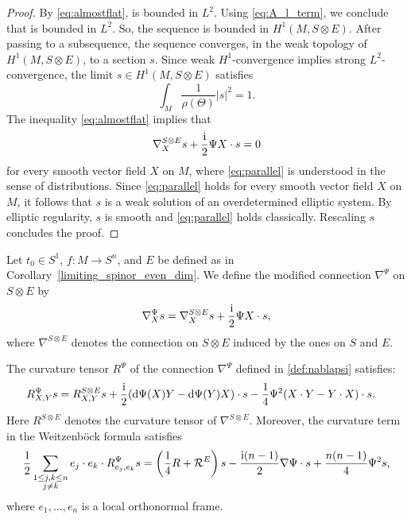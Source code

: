 \begin{proof}
By \eqref{eq:almostflat},  is bounded in $L^2$. Using \eqref{eq:A_l_term}, we conclude that  is bounded in $L^2$. So, the sequence  is bounded in $H^1(M,S \otimes E)$.
After passing to a subsequence, the sequence  converges, in the weak topology of $H^1(M,S \otimes E)$, to a section $s$.
Since weak $H^1$-convergence implies strong $L^2$-convergence, the limit $s \in H^1(M,S \otimes E)$ satisfies
\[
\int_M \frac{1}{\rho(\Theta)} |s|^2 = 1.
\]
The inequality \eqref{eq:almostflat} implies that
\begin{equation}
\nabla_X^{S \otimes E} s + \frac{\rm i}{2} \Psi X \cdot s = 0
\label{eq:parallel}
\end{equation}
for every smooth vector field $X$ on $M$, where \eqref{eq:parallel} is understood in the sense of distributions.
Since \eqref{eq:parallel} holds for every smooth vector field $X$ on $M$, it follows
that $s$ is a weak solution of an overdetermined elliptic system.
By elliptic regularity, $s$ is smooth and \eqref{eq:parallel} holds classically.
Rescaling $s$ concludes the proof.
\end{proof}

\begin{Definition}
Let $t_0 \in S^1$, $f\colon M \to S^n$, and $E$ be defined as in Corollary~\ref{limiting_spinor_even_dim}.
We define the modified connection $\nabla^\Psi$ on $S \otimes E $ by
\begin{equation}
\nabla_X^\Psi s = \nabla_X^{S \otimes E} s + \frac{\rm i}{2} \Psi X \cdot s,
\label{def:nablapsi}
\end{equation}
where $\nabla^{S \otimes E}$ denotes the connection on $S \otimes E$ induced by the ones on $S$ and $E$.
\end{Definition}

\begin{Lemma}
The curvature tensor $R^\Psi$ of the connection $\nabla^\Psi$ defined in \eqref{def:nablapsi} satisfies:
\begin{align}
R^\Psi_{X,Y}s
&=
R^{S\otimes E}_{X,Y}s + \frac{\rm i}{2} ({\rm d}\Psi(X)Y-{\rm d}\Psi(Y)X) \cdot s - \frac{1}{4} \Psi^2 (X\cdot Y-Y\cdot X)\cdot s .
\label{eq:RPsi}
\end{align}
Here $R^{S\otimes E}$ denotes the curvature tensor of $\nabla^{S\otimes E}$.
Moreover, the curvature term in the Weitzen\-b\"ock formula satisfies
\begin{align}
\frac{1}{2} \sum_{\substack{1\leq j,k\leq n\\ j \neq k}} e_j\cdot e_k\cdot R^\Psi_{e_j,e_k}s
=
\left(\frac{1}{4} R + \mathcal{R}^E\right)s - \frac{{\rm i}(n-1)}{2} \nabla\Psi\cdot s + \frac{n(n-1)}{4} \Psi^2 s,
\label{eq:Weitzenbock}
\end{align}
where $e_1,\dots,e_n$ is a local orthonormal frame.
\end{Lemma}

